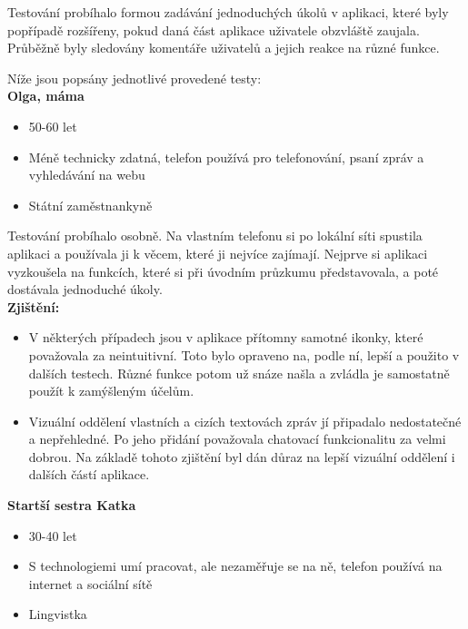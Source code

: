 \documentclass[a4paper, 11pt]{article}
\begin{document}
Testování probíhalo formou zadávání jednoduchých úkolů v aplikaci, které byly popřípadě rozšířeny,
pokud daná část aplikace uživatele obzvláště zaujala. Průběžně byly sledovány komentáře
uživatelů a jejich reakce na různé funkce.

Níže jsou popsány jednotlivé provedené testy: \\

\noindent\textbf{Olga, máma} \\[-1em]
\begin{itemize}
    \item 50-60 let
    \item Méně technicky zdatná, telefon používá pro telefonování, psaní zpráv a vyhledávání na webu
    \item Státní zaměstnankyně
\end{itemize}

Testování probíhalo osobně. Na vlastním telefonu si po lokální síti spustila aplikaci a používala
ji k věcem, které ji nejvíce zajímají. Nejprve si aplikaci vyzkoušela na funkcích, které si při
úvodním průzkumu představovala, a poté dostávala jednoduché úkoly. \\

\textbf{Zjištění:}
\begin{itemize}
    \item V některých případech jsou v aplikace přítomny samotné ikonky, které považovala
    za neintuitivní. Toto bylo opraveno na, podle ní, lepší a použito v dalších testech.
    Různé funkce potom už snáze našla a zvládla je samostatně použít k zamýšleným
    účelům.

    \item Vizuální oddělení vlastních a cizích textovách zpráv jí připadalo
    nedostatečné a nepřehledné. Po jeho přidání považovala chatovací funkcionalitu za velmi dobrou.
    Na základě tohoto zjištění byl dán důraz na lepší vizuální oddělení i dalších částí aplikace.

\end{itemize}


\noindent\textbf{Startší sestra Katka} \\[-1em]
\begin{itemize}
    \item 30-40 let
    \item S technologiemi umí pracovat, ale nezaměřuje se na ně, telefon používá na internet a sociální sítě
    \item Lingvistka
\end{itemize}
\end{document}
